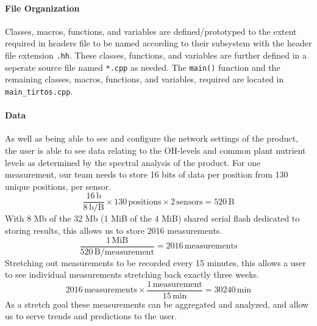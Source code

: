 \paragraph{File Organization}
Classes, macros, functions, and variables are defined/prototyped to the
extent required in headers file to be named according to their subsystem with the header file extension \texttt{.hh}. These
classes, functions, and variables are further defined in a seperate
source file named \texttt{*.cpp} as needed. The \texttt{main()}
function and the remaining classes, macros, functions, and variables,
required are located in \texttt{main\_tirtos.cpp}.

\paragraph{Data} As well as being able to see and configure the network settings of the product, the user is able to see data relating to the OH-levels and common plant nutrient levels as determined by the spectral analysis of the product. For one measurement, our team needs to store 16 bits of data per position from 130 unique positions, per sensor.
\begin{equation}
    \frac{16\,\mathrm{b}}{8\,\mathrm{b/B}}\times 130\,\mathrm{positions} \times 2\,\mathrm{sensors} = 520\,\mathrm{B}
\end{equation}
With 8 Mb of the 32 Mb (1 MiB of the 4 MiB) shared serial flash dedicated to storing results, this allows us to store 2016 measurements.
\begin{equation}
    \frac{1\,\mathrm{MiB}}{520\,\mathrm{B/measurement}} = 2016\,\mathrm{measurements}
\end{equation}
Stretching out measurements to be recorded every 15 minutes, this allows a user to see individual measurements stretching back exactly three weeks.
\begin{equation}
    2016\,\mathrm{measurements} \times \frac{1\,\mathrm{measurement}}{15\,\mathrm{min}} = 30240\,\mathrm{min} 
\end{equation}
As a stretch goal these measurements can be aggregated and analyzed, and allow us to serve trends and predictions to the user.

